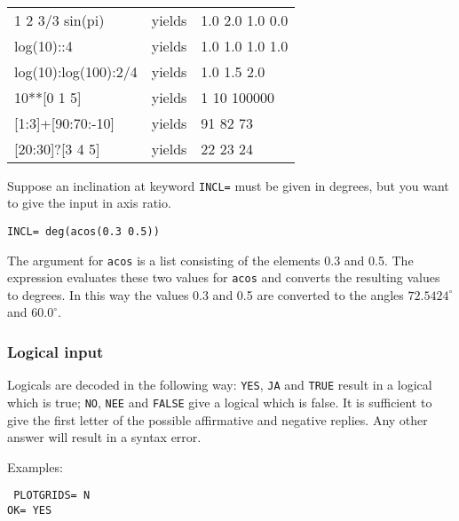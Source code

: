 {\tt
\begin{tabular}{lll}
1 2 3/3  sin(pi)&{\rm yields}&       1.0 2.0 1.0 0.0\\
log(10)::4&{\rm yields}&       1.0 1.0 1.0 1.0\\
log(10):log(100):2/4&  {\rm yields}&       1.0 1.5 2.0\\
10**[0 1 5]     &      {\rm yields}&      1 10 100000\\
{}[1:3]+[90:70:-10]  &     {\rm yields}&       91 82 73\\
{}[20:30]?[3 4 5] & {\rm yields}& 22 23 24\\
\end{tabular}
}

Suppose an inclination at keyword {\tt INCL=} must be given in
degrees, but you want to give the input in axis ratio.

{\tt INCL= deg(acos(0.3 0.5))}

The argument for {\tt acos} is a list consisting of the elements 0.3 and 0.5.
The expression evaluates these two values for {\tt acos} and converts
the resulting values to degrees. In this way the values 0.3 and 0.5
are converted to the angles $72.5424^\circ$ and $60.0^\circ$.

\subsubsection*{Logical input}
Logicals are decoded in the following way: {\tt YES}, {\tt JA} and {\tt TRUE}
result
in a logical which is true; {\tt NO}, {\tt NEE} and {\tt FALSE}
give a logical which
is false. It is sufficient to give the first letter of the possible
affirmative and negative replies. Any other answer will result in
a syntax error.

Examples:
\begin{flushleft}
{\tt
PLOTGRIDS= N\\
OK= YES\\
}
\end{flushleft}

